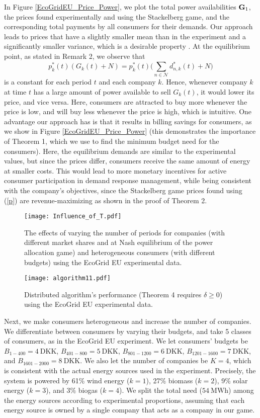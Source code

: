 In Figure \ref{EcoGridEU_Price_Power}, we plot the total power availabilities ${\bf G}_1$, the prices found experimentally and using the Stackelberg game, and the corresponding total payments by all consumers for their demands. Our approach leads to prices that have a slightly smaller mean than in the experiment and a significantly smaller variance, which is a desirable property \cite{IFAC}. {\color{black} At the equilibrium point, as stated in Remark 2, we observe that $$p^*_k(t)(G_k(t)+N)=p^*_k(t)\Bigg(\sum_{n\in\mathcal{N}}  d^*_{n,k}(t)+N\Bigg)$$  is a constant for each period $t$ and each company $k$. Hence, whenever company $k$ at time $t$ has a large amount of power available to sell $G_k(t)$, it would lower its price, and vice versa. Here, consumers are attracted to buy more whenever the price is low, and will buy less whenever the price is high, which is intuitive.} One advantage our approach has is that it results in billing savings for consumers, as we show in Figure \ref{EcoGridEU_Price_Power} (this demonstrates the importance of Theorem 1, which we use to find the minimum budget need for the consumers). {\color{blue} Here, the equilibrium demands are similar to the experimental values, but since the prices differ,  consumers receive the same amount of energy at smaller costs}. This would lead to more monetary incentives for active consumer participation in demand response management, while being consistent with the company's objectives, since the Stackelberg game prices found using (\ref{p}) are revenue-maximizing as shown in the proof of Theorem 2.
\begin{figure*}
\centering
\texttt{[image: Influence\_of\_T.pdf]}
\caption{The effects of varying the number of periods for companies (with different market shares and at Nash equilibrium of the power allocation game) and heterogeneous consumers (with different budgets) using the EcoGrid EU experimental data.}
\label{Influence_of_T}
\end{figure*}
\begin{figure*}
\centering
\texttt{[image: algorithm11.pdf]}
\caption{ Distributed algorithm's performance (Theorem 4 requires $\delta\geq0$) using the EcoGrid EU experimental data.}
\label{algorithm1}
\end{figure*}

Next, we make consumers heterogeneous and increase the number of companies. We differentiate between consumers by varying their budgets, and take 5 classes of consumers, as in the EcoGrid EU experiment. We let consumers' budgets be $B_{1-400}=4  \ \text{DKK}$, $B_{401-800}=5  \ \text{DKK}$, $B_{801-1200}=6 \  \text{DKK}$, $B_{1201-1600}=7  \ \text{DKK}$, and $B_{1601-2000}=8 \ \text{DKK}$. We also let the number of companies be $K=4$, which is consistent with the actual energy sources used in the experiment. Precisely, the system is powered by 61\% wind energy ($k=1$), 27\% biomass ($k=2$), 9\% solar energy ($k=3$), and 3\% biogas ($k=4$). We split the {\color{black}total need ($54 \ \text{MWh}$)} among the energy sources according to experimental proportions, assuming that each energy source is owned by a single company that acts as a company in our game. 
 
